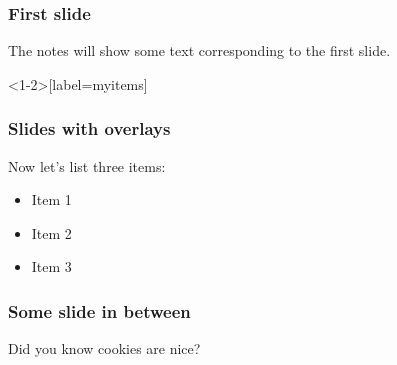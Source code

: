 \documentclass{beamer}
\begin{document}
\begin{frame}
  \frametitle{First slide}
  The notes will show some text corresponding to the first slide.
\end{frame}

\begin{frame}<1-2>[label=myitems]
  \frametitle{Slides with overlays}
  Now let's list three items:
  \begin{itemize}
  \item<1-> Item 1
  \item<2-> Item 2
  \item<3-> Item 3
  \end{itemize}
\end{frame}

\begin{frame}
  \frametitle{Some slide in between}
  Did you know cookies are nice?
\end{frame}

\end{document}
